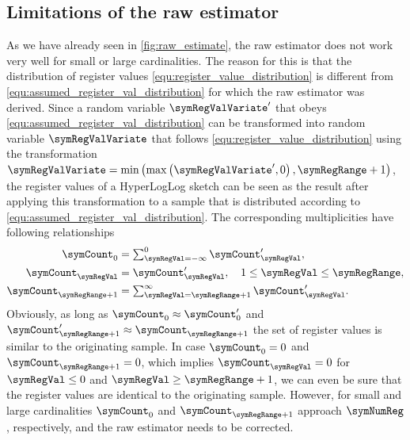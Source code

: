 \documentclass[a4paper]{scrartcl}
\begin{document}
\subsection{Limitations of the raw estimator}
As we have already seen in \cref{fig:raw_estimate}, the raw estimator does not work very well for small or large cardinalities. The reason for this is that the distribution of register values \eqref{equ:register_value_distribution} is different from \eqref{equ:assumed_register_val_distribution} for which the raw estimator was derived. Since a random variable $\symRegValVariate'$ that obeys \eqref{equ:assumed_register_val_distribution} can be transformed into random variable $\symRegValVariate$ that follows \eqref{equ:register_value_distribution} using the transformation $\symRegValVariate = \min\left(\max\left(\symRegValVariate', 0\right), \symRegRange+1\right)$, the register values of a HyperLogLog sketch can be seen as the result after applying this transformation to a sample that is distributed according to \eqref{equ:assumed_register_val_distribution}. The corresponding multiplicities have  following relationships
\begin{equation}
\label{equ:multiplicity_transformation}
\begin{aligned}
\symCount_0 &= \textstyle\sum_{\symRegVal = -\infty}^{0} \symCount'_\symRegVal, \\
\symCount_\symRegVal &=  \symCount'_\symRegVal, \quad 1\leq\symRegVal\leq\symRegRange,\\
\symCount_{\symRegRange+1} &= \textstyle\sum_{\symRegVal = \symRegRange + 1}^{\infty} \symCount'_\symRegVal.
\end{aligned}
\end{equation}
Obviously, as long as $\symCount_0\approx\symCount'_0$ and  $\symCount'_{\symRegRange+1}\approx\symCount_{\symRegRange+1}$ the set of register values is similar to the originating sample. In case $\symCount_0=0$ and $\symCount_{\symRegRange+1}=0$, which implies $\symCount_\symRegVal=0$ for $\symRegVal\leq0$ and $\symRegVal\geq\symRegRange+1$, we can even be sure that the register values are identical to the originating sample. However, for small and large cardinalities $\symCount_0$ and $\symCount_{\symRegRange+1}$ approach $\symNumReg$, respectively, and the raw estimator needs to be corrected.
\end{document}

